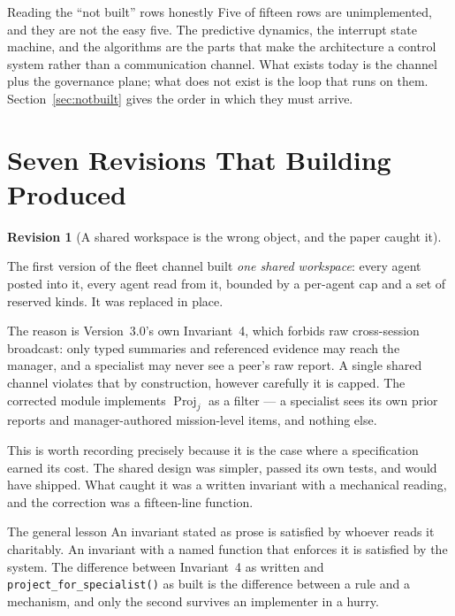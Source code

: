 \documentclass[11pt]{article}
\newtheorem{revision}{Revision}
\newcommand{\code}[1]{\texttt{\small #1}}
\newcommand{\op}[1]{\operatorname{#1}}
\begin{document}
\begin{notebox}{Reading the ``not built'' rows honestly}
Five of fifteen rows are unimplemented, and they are not the easy five. The predictive dynamics, the interrupt state machine, and the algorithms are the parts that make the architecture a control system rather than a communication channel. What exists today is the channel plus the governance plane; what does not exist is the loop that runs on them. Section~\ref{sec:notbuilt} gives the order in which they must arrive.
\end{notebox}

\section{Seven Revisions That Building Produced}
\label{sec:revisions}

\begin{revision}[A shared workspace is the wrong object, and the paper caught it]
\label{rev:shared}
\end{revision}

\noindent The first version of the fleet channel built \emph{one shared workspace}: every agent posted into it, every agent read from it, bounded by a per-agent cap and a set of reserved kinds. It was replaced in place.

The reason is Version~3.0's own Invariant~4, which forbids raw cross-session broadcast: only typed summaries and referenced evidence may reach the manager, and a specialist may never see a peer's raw report. A single shared channel violates that by construction, however carefully it is capped. The corrected module implements $\op{Proj}_j$ as a filter --- a specialist sees its own prior reports and manager-authored mission-level items, and nothing else.

This is worth recording precisely because it is the case where a specification earned its cost. The shared design was simpler, passed its own tests, and would have shipped. What caught it was a written invariant with a mechanical reading, and the correction was a fifteen-line function.

\begin{claimbox}{The general lesson}
An invariant stated as prose is satisfied by whoever reads it charitably. An invariant with a named function that enforces it is satisfied by the system. The difference between Invariant~4 as written and \code{project\_\allowbreak{}for\_\allowbreak{}specialist()} as built is the difference between a rule and a mechanism, and only the second survives an implementer in a hurry.
\end{claimbox}
\end{document}

